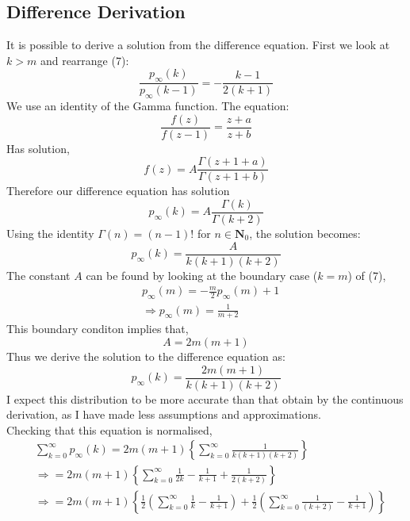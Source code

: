 \documentclass[]{article}
\begin{document}
\subsection{Difference Derivation}
It is possible to derive a solution from the difference equation. First we look at $k>m$ and rearrange (7):
\begin{equation}
\frac{p_{\infty}(k)}{p_{\infty}(k-1)}=-\frac{k-1}{2(k+1)}
\end{equation}
We use an identity of the Gamma function. The equation:
\begin{equation}
\frac{f(z)}{f(z-1)}=\frac{z+a}{z+b}
\end{equation}
Has solution,
\begin{equation}
f(z)=A\frac{\Gamma(z+1+a)}{\Gamma(z+1+b)}
\end{equation}
Therefore our difference equation has solution
\begin{equation}
p_{\infty}(k)=A\frac{\Gamma(k)}{\Gamma(k+2)}
\end{equation}
Using the identity $\Gamma(n)=(n-1)!$ for $n \in \mathbf{N}_0$, the solution becomes:
\begin{equation}
p_{\infty}(k)=\frac{A}{k(k+1)(k+2)}
\end{equation}
The constant $A$ can be found by looking at the boundary case ($k=m$) of (7),
\begin{align}
&p_{\infty}(m)=-\frac{m}{2}p_{\infty}(m)+1\\
&\Rightarrow p_{\infty}(m)=\frac{1}{m+2}
\end{align}
This boundary conditon implies that, 
\begin{equation}
A= 2m(m+1)
\end{equation}
Thus we derive the solution to the difference equation as:
\begin{equation}
p_{\infty}(k)=\frac{2m(m+1)}{k(k+1)(k+2)}
\end{equation}
I expect this distribution to be more accurate than that obtain by the continuous derivation, as I have made less assumptions and approximations.\\
Checking that this equation is normalised,
\begin{align*}
&\sum_{k=0}^{\infty} p_{\infty}(k)=2m(m+1)\left\{ \sum_{k=0}^{\infty}\frac{1}{k(k+1)(k+2)}\right\}\\
&\Rightarrow = 2m(m+1)\left\{\sum_{k=0}^{\infty} \frac{1}{2k} - \frac{1}{k+1} + \frac{1}{2(k+2)} \right\}\\
&\Rightarrow = 2m(m+1)\left\{\frac{1}{2}\left(\sum_{k=0}^{\infty} \frac{1}{k} - \frac{1}{k+1}\right) +\frac{1}{2}\left(\sum_{k=0}^{\infty} \frac{1}{(k+2)} - \frac{1}{k+1}\right) \right\}
\end{align*}
\end{document}
